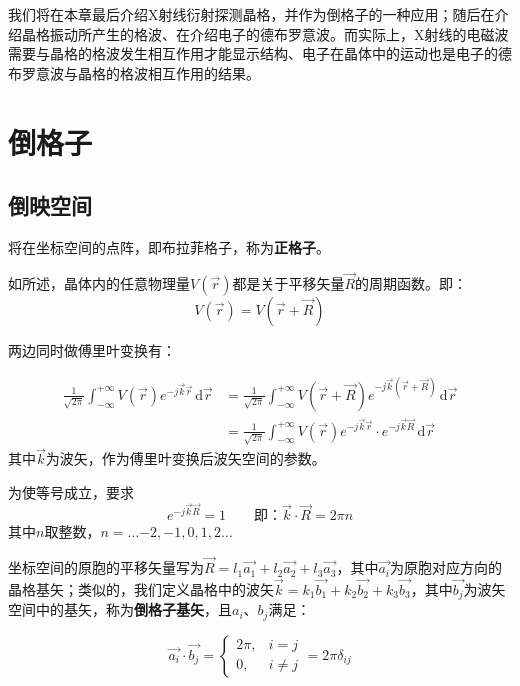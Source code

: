     我们将在本章最后介绍X射线衍射探测晶格，并作为倒格子的一种应用；随后在介绍晶格振动所产生的格波、在介绍电子的德布罗意波。而实际上，X射线的电磁波需要与晶格的格波发生相互作用才能显示结构、电子在晶体中的运动也是电子的德布罗意波与晶格的格波相互作用的结果。
    
\section{倒格子}
\subsection{倒映空间}
    将在坐标空间的点阵，即布拉菲格子，称为\textbf{正格子}。

    如所述，晶体内的任意物理量$V(\vec{r})$都是关于平移矢量$\vec{R}$的周期函数。即：
    \begin{equation}
        V(\vec{r})=V(\vec{r}+\vec{R})
    \end{equation}

    两边同时做傅里叶变换有：

    \begin{equation}
    \begin{aligned}
        \frac{1}{\sqrt{2\pi}}\int_{-\infty}^{+\infty} V(\vec{r})e^{-j\vec{k}\vec{r}} \,\mathrm{d}\vec{r}&=\frac{1}{\sqrt{2\pi}}\int_{-\infty}^{+\infty} V(\vec{r}+\vec{R})e^{-j\vec{k}(\vec{r}+\vec{R})} \,\mathrm{d}\vec{r}\\
        &=\frac{1}{\sqrt{2\pi}}\int_{-\infty}^{+\infty} V(\vec{r})e^{-j\vec{k}\vec{r}}\cdot e^{-j\vec{k}\vec{R}} \,\mathrm{d}\vec{r}
    \end{aligned}
    \end{equation}
    其中$\vec{k}$为波矢，作为傅里叶变换后波矢空间的参数。

    为使等号成立，要求
    \begin{equation}
        e^{-j\vec{k}\vec{R}}=1\qquad\mbox{即：}\vec{k}\cdot\vec{R}=2\pi n
    \end{equation}
    其中$n$取整数，$n=\dots{-2},-1,0,1,2\dots$

    坐标空间的原胞的平移矢量写为$\vec{R}=l_1\vec{a_1}+l_2\vec{a_2}+l_3\vec{a_3}$，其中$\vec{a_i}$为原胞对应方向的晶格基矢；类似的，我们定义晶格中的波矢$\vec{k}=k_1\vec{b_1}+k_2\vec{b_2}+k_3\vec{b_3}$，其中$\vec{b_j}$为波矢空间中的基矢，称为\textbf{倒格子基矢}，且$a_i$、$b_j$满足：

    \begin{equation}\label{eq:2.6}
        \vec{a_i}\cdot\vec{b_j}=
        \begin{cases}
            2\pi,&i=j\\
            0,&i\neq j
        \end{cases}
        =2\pi\delta_{ij}
    \end{equation}

